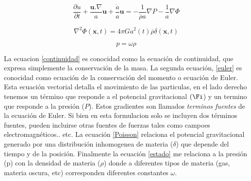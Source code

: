 \begin{equation}
    \frac{\partial{u}}{\partial{t}}+\frac{\textbf{u}.\nabla}{a}\textbf{u}+\frac{\dot{a}}{a}\textbf{u}=-\frac{1}{\overline{\rho}a}\nabla{P}-\frac{1}{a}\nabla{\Phi}
    \label{euler}
\end{equation}{}

\begin{equation}
    \nabla^{2}\Phi(\textbf{x},t)=4\pi Ga^{2}(t)\overline{\rho}\delta(\textbf{x},t)
    \label{poisson}
\end{equation}{}

\begin{equation}
    p=\omega \rho
    \label{estado}
\end{equation}{}

La ecuacion \ref{continuidad} es conocidad como la ecuaci\'on de continuidad, que expresa simplemente la conservaci\'on de la masa. La segunda ecuaci\'on, \ref{euler} es conocidad como ecuaci\'on de la conservaci\'on del momento o ecuaci\'on de Euler. Esta ecuaci\'on vectorial detalla el movimiento de las particulas, en el lado derecho tenemos un t\'ermino que responde a el potencial gravitacional $(\Fi$) y un termino que responde a la presi\'on ($P$). Estos gradientes son llamados \textit{terminos fuentes} de la ecuaci\'on de Euler. Si bien en esta formulacion solo se incluyen dos t\'erminos fuentes, pueden incluirse otras fuentes de fuerzas tales como campoes electromagn\'eticos.. etc. La ecuaci\'on \ref{Poisson} relaciona el potencial gravitacional generado por una distribuci\'on inhomogenea de materia ($\delta$) que depende del tiempo y de la posici\'on. Finalmente la ecuaci\'on \ref{estado} me relaciona a la presi\'on (p) con la densidad de materia ($\rho$) donde a diferentes tipos de materia (gas, materia oscura, etc) corresponden diferentes constantes $\omega$. 





